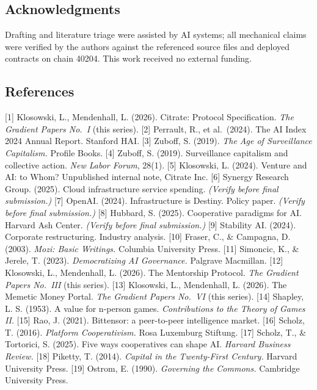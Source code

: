 \subsection{Acknowledgments}\label{acknowledgments}

Drafting and literature triage were assisted by AI systems; all
mechanical claims were verified by the authors against the referenced
source files and deployed contracts on chain 40204. This work received
no external funding.

\subsection{References}\label{references}

{[}1{]} Klosowski, L., Mendenhall, L. (2026). Citrate: Protocol
Specification. \emph{The Gradient Papers No.~I} (this series). {[}2{]}
Perrault, R., et al.~(2024). The AI Index 2024 Annual Report. Stanford
HAI. {[}3{]} Zuboff, S. (2019). \emph{The Age of Surveillance
Capitalism.} Profile Books. {[}4{]} Zuboff, S. (2019). Surveillance
capitalism and collective action. \emph{New Labor Forum}, 28(1). {[}5{]}
Klosowski, L. (2024). Venture and AI: to Whom? Unpublished internal
note, Citrate Inc. {[}6{]} Synergy Research Group. (2025). Cloud
infrastructure service spending. \emph{(Verify before final
submission.)} {[}7{]} OpenAI. (2024). Infrastructure is Destiny. Policy
paper. \emph{(Verify before final submission.)} {[}8{]} Hubbard, S.
(2025). Cooperative paradigms for AI. Harvard Ash Center. \emph{(Verify
before final submission.)} {[}9{]} Stability AI. (2024). Corporate
restructuring. Industry analysis. {[}10{]} Fraser, C., \& Campagna, D.
(2003). \emph{Mozi: Basic Writings.} Columbia University Press. {[}11{]}
Simoncic, K., \& Jerele, T. (2023). \emph{Democratizing AI Governance.}
Palgrave Macmillan. {[}12{]} Klosowski, L., Mendenhall, L. (2026). The
Mentorship Protocol. \emph{The Gradient Papers No.~III} (this series).
{[}13{]} Klosowski, L., Mendenhall, L. (2026). The Memetic Money Portal.
\emph{The Gradient Papers No.~VI} (this series). {[}14{]} Shapley, L. S.
(1953). A value for n-person games. \emph{Contributions to the Theory of
Games II.} {[}15{]} Rao, J. (2021). Bittensor: a peer-to-peer
intelligence market. {[}16{]} Scholz, T. (2016). \emph{Platform
Cooperativism.} Rosa Luxemburg Stiftung. {[}17{]} Scholz, T., \&
Tortorici, S. (2025). Five ways cooperatives can shape AI. \emph{Harvard
Business Review.} {[}18{]} Piketty, T. (2014). \emph{Capital in the
Twenty-First Century.} Harvard University Press. {[}19{]} Ostrom, E.
(1990). \emph{Governing the Commons.} Cambridge University Press.

